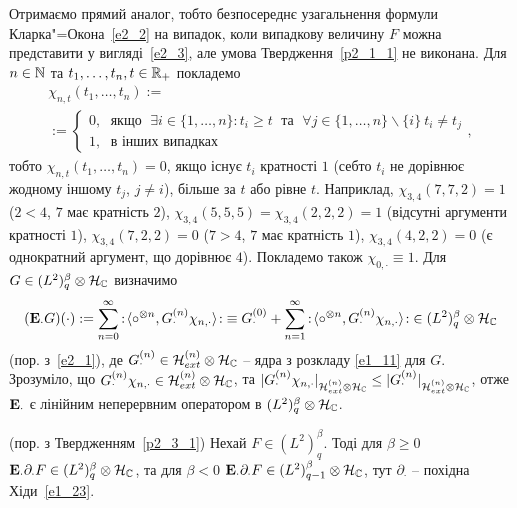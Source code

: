 Отримаємо прямий аналог, тобто безпосереднє узагальнення формули Кларка"=Окона~\eqref{e2_2}
на випадок, коли випадкову величину $F$ можна представити у вигляді~\eqref{e2_3}, але
умова Твердження~\ref{p2_1_1} не виконана. Для $n\in\mathbb{N}$ та
$t_1,\dots,t_n,t\in\mathbb{R}_+$ покладемо
\begin{equation}\label{e2_13}
\begin{gathered}
\chi_{n,t}(t_1,\dots,t_n):=\\
:=\begin{cases}
0,{\operatorname{\ \text{якщо}\ }}
\exists i\in\{1,\dots,n\}:t_i\geq t
{\operatorname{\ \text{та}\ }} \forall j\in\{1,\dots,n\}
\backslash\{i\}\ t_i\not=t_j
\\
1, {\operatorname{\ \text{в}\ \text{інших}\ \text{випадках}}}
\end{cases},
\end{gathered}
\end{equation}
тобто $\chi_{n,t}(t_1,\dots,t_n)=0$, якщо існує $t_i$ кратності $1$ (себто $t_i$ не дорівнює
жодному іншому $t_j$, $j\not=i$), більше за $t$ або рівне $t$. Наприклад,
$\chi_{3,4}(7,7,2)=1$ ($2<4$, $7$ має кратність $2$),
$\chi_{3,4}(5,5,5)=\chi_{3,4}(2,2,2)=1$ (відсутні аргументи кратності $1$),
$\chi_{3,4}(7,2,2)=0$ ($7>4$, $7$ має кратність $1$), $\chi_{3,4}(4,2,2)=0$ (є однократний
аргумент, що дорівнює $4$). Покладемо також $\chi_{0,\cdot}\equiv 1$. Для
$G\in (L^2)^\beta_q\otimes\mathcal{H}_{\mathbb{C}}$ визначимо
\begin{equation}\label{e2_14}
(\mathbf{E}_\cdot G)(\cdot):=\sum_{n=0}^\infty
{:\!\langle}\circ^{\otimes n},G^{(n)}_\cdot\chi_{n,\cdot}{\rangle\!:}
\equiv G^{(0)}_\cdot+\sum_{n=1}^\infty
{:\!\langle}\circ^{\otimes n},G^{(n)}_\cdot\chi_{n,\cdot}{\rangle\!:}
\in (L^2)^\beta_q\otimes\mathcal{H}_{\mathbb{C}}
\end{equation}
(пор. з~\eqref{e2_1}), де
$G^{(n)}_\cdot\in\mathcal{H}_{ext}^{(n)}\otimes\mathcal{H}_{\mathbb{C}}$ -- ядра з розкладу
\eqref{e1_11} для $G$. Зрозуміло, що
$G^{(n)}_\cdot\chi_{n,\cdot}\in\mathcal{H}_{ext}^{(n)}\otimes\mathcal{H}_{\mathbb{C}}$,
та
$|G^{(n)}_\cdot\chi_{n,\cdot}|_{\mathcal{H}_{ext}^{(n)}\otimes\mathcal{H}_{\mathbb{C}}}
\leq |G^{(n)}_\cdot|_{\mathcal{H}_{ext}^{(n)}\otimes\mathcal{H}_{\mathbb{C}}}$, отже
$\mathbf{E}_\cdot$ є лінійним неперервним оператором в
$(L^2)^\beta_q\otimes\mathcal{H}_{\mathbb{C}}$.
\begin{subproposition}{\rm (пор. з Твердженням~\ref{p2_3_1})}\label{p2_4_1}
Нехай $F\in (L^2)^\beta_q$. Тоді для $\beta\geq 0$
$\mathbf{E}_\cdot\partial_\cdot F\in (L^2)^\beta_q\otimes\mathcal{H}_{\mathbb{C}}$, та для
$\beta<0$ $\mathbf{E}_\cdot\partial_\cdot F\in (L^2)^\beta_{q-1}\otimes\mathcal{H}_{\mathbb{C}}$,
тут $\partial_\cdot$ -- похідна Хіди~\eqref{e1_23}.
\end{subproposition}
